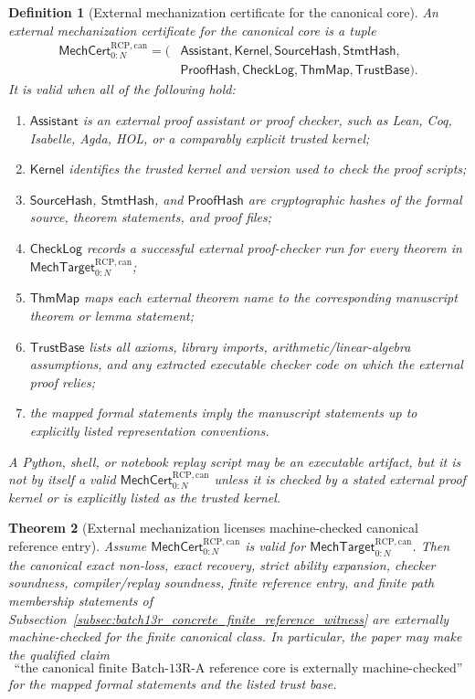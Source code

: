 \documentclass[11pt]{article}
\newtheorem{theorem}{Theorem}[section]
\newtheorem{definition}[theorem]{Definition}
\newcommand{\1}{\mathbf{1}}
\newcommand{\RCP}{\mathrm{RCP}}
\begin{document}
\begin{definition}[External mechanization certificate for the canonical core]
\label{def:batch13rb_external_mechanization_certificate}
An external mechanization certificate for the canonical core is a tuple
\[
\begin{aligned}
\mathsf{MechCert}_{0:N}^{\RCP,\mathrm{can}}
=(&\mathsf{Assistant},\mathsf{Kernel},\mathsf{SourceHash},\mathsf{StmtHash},\\
&\mathsf{ProofHash},\mathsf{CheckLog},\mathsf{ThmMap},\mathsf{TrustBase}).
\end{aligned}
\]
It is valid when all of the following hold:
\begin{enumerate}[label=(\roman*),leftmargin=1.5em]
    \item \(\mathsf{Assistant}\) is an external proof assistant or proof checker, such as Lean, Coq, Isabelle, Agda, HOL, or a comparably explicit trusted kernel;
    \item \(\mathsf{Kernel}\) identifies the trusted kernel and version used to check the proof scripts;
    \item \(\mathsf{SourceHash}\), \(\mathsf{StmtHash}\), and \(\mathsf{ProofHash}\) are cryptographic hashes of the formal source, theorem statements, and proof files;
    \item \(\mathsf{CheckLog}\) records a successful external proof-checker run for every theorem in \(\mathsf{MechTarget}_{0:N}^{\RCP,\mathrm{can}}\);
    \item \(\mathsf{ThmMap}\) maps each external theorem name to the corresponding manuscript theorem or lemma statement;
    \item \(\mathsf{TrustBase}\) lists all axioms, library imports, arithmetic/linear-algebra assumptions, and any extracted executable checker code on which the external proof relies;
    \item the mapped formal statements imply the manuscript statements up to explicitly listed representation conventions.
\end{enumerate}
A Python, shell, or notebook replay script may be an executable artifact, but it is not by itself a valid \(\mathsf{MechCert}_{0:N}^{\RCP,\mathrm{can}}\) unless it is checked by a stated external proof kernel or is explicitly listed as the trusted kernel.
\end{definition}

\begin{theorem}[External mechanization licenses machine-checked canonical reference entry]
\label{thm:batch13rb_external_mechanization_licenses_machine_checked_entry}
Assume \(\mathsf{MechCert}_{0:N}^{\RCP,\mathrm{can}}\) is valid for \(\mathsf{MechTarget}_{0:N}^{\RCP,\mathrm{can}}\).  Then the canonical exact non-loss, exact recovery, strict ability expansion, checker soundness, compiler/replay soundness, finite reference entry, and finite path membership statements of Subsection~\ref{subsec:batch13r_concrete_finite_reference_witness} are externally machine-checked for the finite canonical class.  In particular, the paper may make the qualified claim
\[
\text{``the canonical finite Batch-13R-A reference core is externally machine-checked''}
\]
for the mapped formal statements and the listed trust base.
\end{theorem}
\end{document}
